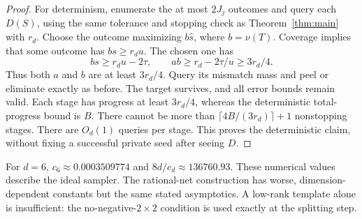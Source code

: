 \begin{proof}
For determinism, enumerate the at most $2J_j$ outcomes and query each $D(S)$, using the same tolerance and stopping check as Theorem~\ref{thm:main} with $r_d$. Choose the outcome maximizing $b\widehat s$, where $b=\nu(T)$. Coverage implies that some outcome has $bs\ge r_du$. The chosen one has
\[
 bs\ge r_du-2\tau,\qquad ab\ge r_d-2\tau/u\ge3r_d/4.
\]
Thus both $a$ and $b$ are at least $3r_d/4$. Query its mismatch mass and peel or eliminate exactly as before. The target survives, and all error bounds remain valid. Each stage has progress at least $3r_d/4$, whereas the deterministic total-progress bound is $B$. There cannot be more than $\lceil4B/(3r_d)\rceil+1$ nonstopping stages. There are $O_d(1)$ queries per stage. This proves the deterministic claim, without fixing a successful private seed after seeing $D$.
\end{proof}

For $d=6$, $c_6\approx0.0003509774$ and $8d/c_d\approx136760.93$. These numerical values describe the ideal sampler. The rational-net construction has worse, dimension-dependent constants but the same stated asymptotics. A low-rank template alone is insufficient: the no-negative-$2\times2$ condition is used exactly at the splitting step.
